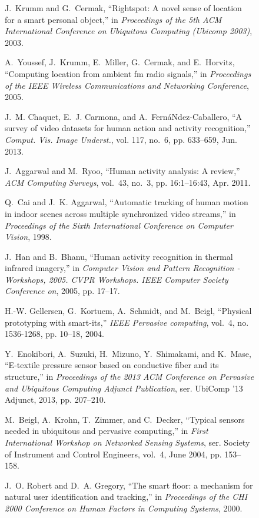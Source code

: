 \documentclass[journal]{IEEEtran}
\begin{document}
\begin{figure*}
\begin{thebibliography}{100}
J.~Krumm and G.~Cermak, ``Rightspot: A novel sense of location for a smart
  personal object,'' in \emph{Proceedings of the 5th ACM International
  Conference on Ubiquitous Computing (Ubicomp 2003)}, 2003.

A.~Youssef, J.~Krumm, E.~Miller, G.~Cermak, and E.~Horvitz, ``Computing
  location from ambient fm radio signals,'' in \emph{Proceedings of the IEEE
  Wireless Communications and Networking Conference}, 2005.

J.~M. Chaquet, E.~J. Carmona, and A.~Fern\'{a}Ndez-Caballero, ``A survey of
  video datasets for human action and activity recognition,'' \emph{Comput.
  Vis. Image Underst.}, vol. 117, no.~6, pp. 633--659, Jun. 2013.

J.~Aggarwal and M.~Ryoo, ``Human activity analysis: A review,'' \emph{ACM
  Computing Surveys}, vol.~43, no.~3, pp. 16:1--16:43, Apr. 2011.

Q.~Cai and J.~K. Aggarwal, ``Automatic tracking of human motion in indoor
  scenes across multiple synchronized video streams,'' in \emph{Proceedings of
  the Sixth International Conference on Computer Vision}, 1998.

J.~Han and B.~Bhanu, ``Human activity recognition in thermal infrared
  imagery,'' in \emph{Computer Vision and Pattern Recognition - Workshops,
  2005. CVPR Workshops. IEEE Computer Society Conference on}, 2005, pp. 17--17.

H.-W. Gellersen, G.~Kortuem, A.~Schmidt, and M.~Beigl, ``Physical prototyping
  with smart-its,'' \emph{IEEE Pervasive computing}, vol.~4, no. 1536-1268, pp.
  10--18, 2004.

Y.~Enokibori, A.~Suzuki, H.~Mizuno, Y.~Shimakami, and K.~Mase, ``E-textile
  pressure sensor based on conductive fiber and its structure,'' in
  \emph{Proceedings of the 2013 ACM Conference on Pervasive and Ubiquitous
  Computing Adjunct Publication}, ser. UbiComp '13 Adjunct, 2013, pp. 207--210.

M.~Beigl, A.~Krohn, T.~Zimmer, and C.~Decker, ``Typical sensors needed in
  ubiquitous and pervasive computing,'' in \emph{First International Workshop
  on Networked Sensing Systems}, ser. Society of Instrument and Control
  Engineers, vol.~4, June 2004, pp. 153--158.

J.~O. Robert and D.~A. Gregory, ``The smart floor: a mechanism for natural user
  identification and tracking,'' in \emph{Proceedings of the CHI 2000
  Conference on Human Factors in Computing Systems}, 2000.


\end{thebibliography}
\end{figure*}
\end{document}
